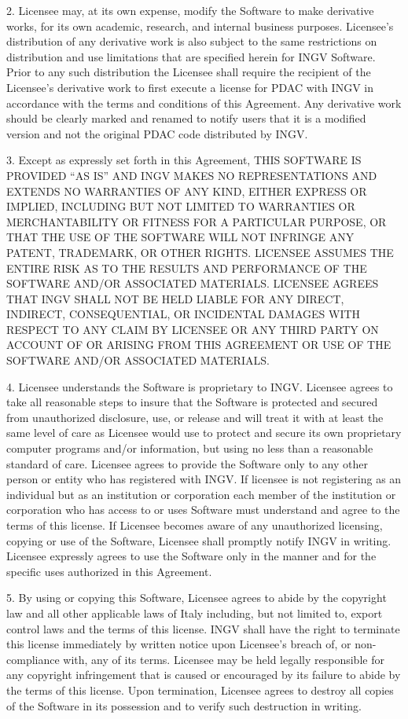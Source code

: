 2. Licensee may, at its own expense, modify the Software to make derivative
works, for its own academic, research, and internal business purposes.
Licensee's distribution of any derivative work is also subject to the same
restrictions on distribution and use limitations that are specified herein
for INGV Software. Prior to any such distribution the Licensee shall 
require the recipient of the Licensee's derivative work to first execute a 
license for PDAC with INGV in accordance with the terms and conditions 
of this Agreement. Any derivative work should be clearly marked and 
renamed to notify users that it is a modified version and not the original 
PDAC code distributed by INGV.

3. Except as expressly set forth in this Agreement, THIS SOFTWARE IS 
PROVIDED ``AS IS'' AND INGV MAKES NO REPRESENTATIONS AND EXTENDS NO 
WARRANTIES OF ANY KIND, EITHER EXPRESS OR IMPLIED, INCLUDING BUT NOT 
LIMITED TO WARRANTIES OR MERCHANTABILITY OR FITNESS FOR A PARTICULAR 
PURPOSE, OR THAT THE USE OF THE SOFTWARE WILL NOT INFRINGE ANY PATENT, 
TRADEMARK, OR OTHER RIGHTS. LICENSEE ASSUMES THE ENTIRE RISK AS TO 
THE RESULTS AND PERFORMANCE OF THE SOFTWARE AND/OR ASSOCIATED MATERIALS. 
LICENSEE AGREES THAT INGV SHALL NOT BE HELD LIABLE FOR ANY DIRECT, 
INDIRECT, CONSEQUENTIAL, OR INCIDENTAL DAMAGES WITH RESPECT TO ANY 
CLAIM BY LICENSEE OR ANY THIRD PARTY ON ACCOUNT OF OR ARISING FROM 
THIS AGREEMENT OR USE OF THE SOFTWARE AND/OR ASSOCIATED MATERIALS.

4. Licensee understands the Software is proprietary to INGV. 
Licensee agrees to take all reasonable steps to insure that the Software 
is protected and secured from unauthorized disclosure, use, or release 
and will treat it with at least the same level of care as Licensee would 
use to protect and secure its own proprietary computer programs and/or 
information, but using no less than a reasonable standard of care. 
Licensee agrees to provide the Software only to any other person or 
entity who has registered with INGV. If licensee is not registering 
as an individual but as an institution or corporation each member of 
the institution or corporation who has access to or uses Software must 
understand and agree to the terms of this license. If Licensee becomes 
aware of any unauthorized licensing, copying or use of the Software, 
Licensee shall promptly notify INGV in writing. Licensee expressly 
agrees to use the Software only in the manner and for the specific uses 
authorized in this Agreement.

5. By using or copying this Software, Licensee agrees to abide by the
copyright law and all other applicable laws of Italy including, but 
not limited to, export control laws and the terms of this license. 
INGV shall have the right to terminate this license immediately by 
written notice upon Licensee's breach of, or non-compliance with, any 
of its terms. Licensee may be held legally responsible for any copyright 
infringement that is caused or encouraged by its failure to abide by 
the terms of this license. Upon termination, Licensee agrees to destroy 
all copies of the Software in its possession and to verify such 
destruction in writing.

